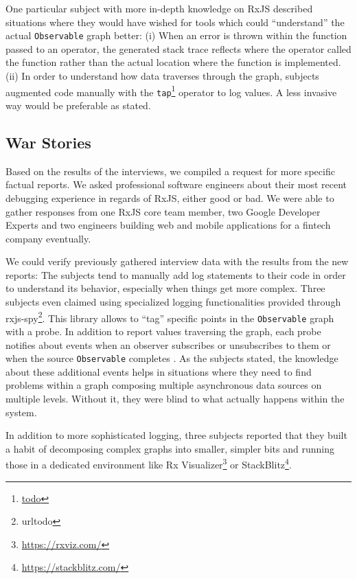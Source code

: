 \documentclass[12pt,a4paper]{article}
\begin{document}
One particular subject with more in-depth knowledge on RxJS described situations where they would have wished for tools which could ``understand'' the actual \texttt{Observable} graph better: (i) When an error is thrown within the function passed to an operator, the generated stack trace reflects where the operator called the function rather than the actual location where the function is implemented. (ii) In order to understand how data traverses through the graph, subjects augmented code manually with the \texttt{tap}\footnote{\url{todo}} operator to log values. A less invasive way would be preferable as stated.

\subsection{War Stories}

Based on the results of the interviews, we compiled a request for more specific factual reports. We asked professional software engineers about their most recent debugging experience in regards of RxJS, either good or bad. We were able to gather responses from one RxJS core team member, two Google Developer Experts and two engineers building web and mobile applications for a fintech company eventually.

We could verify previously gathered interview data with the results from the new reports: The subjects tend to manually add log statements to their code in order to understand its behavior, especially when things get more complex. Three subjects even claimed using specialized logging functionalities provided through rxjs-spy\footnote{url{todo}}. This library allows to ``tag'' specific points in the \texttt{Observable} graph with a probe. In addition to report values traversing the graph, each probe notifies about events when an observer subscribes or unsubscribes to them or when the source \texttt{Observable} completes \cite{rxjs-lifecycle} \cite{rxjs-spy-events}. As the subjects stated, the knowledge about these additional events helps in situations where they need to find problems within a graph composing multiple asynchronous data sources on multiple levels. Without it, they were blind to what actually happens within the system.

In addition to more sophisticated logging, three subjects reported that they built a habit of decomposing complex graphs into smaller, simpler bits and running those in a dedicated environment like Rx Visualizer\footnote{\url{https://rxviz.com/}} or StackBlitz\footnote{\url{https://stackblitz.com/}}.
\end{document}
